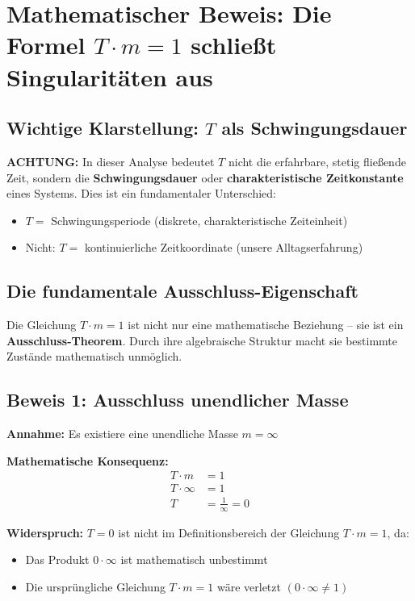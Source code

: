\section{Mathematischer Beweis: Die Formel $T \cdot m = 1$ schließt Singularitäten aus}

\subsection{Wichtige Klarstellung: $T$ als Schwingungsdauer}

\textbf{ACHTUNG:} In dieser Analyse bedeutet $T$ nicht die erfahrbare, stetig fließende Zeit, sondern die \textbf{Schwingungsdauer} oder \textbf{charakteristische Zeitkonstante} eines Systems. Dies ist ein fundamentaler Unterschied:

\begin{itemize}
	\item $T =$ Schwingungsperiode (diskrete, charakteristische Zeiteinheit)
	\item Nicht: $T =$ kontinuierliche Zeitkoordinate (unsere Alltagserfahrung)
\end{itemize}

\subsection{Die fundamentale Ausschluss-Eigenschaft}

Die Gleichung $T \cdot m = 1$ ist nicht nur eine mathematische Beziehung -- sie ist ein \textbf{Ausschluss-Theorem}. Durch ihre algebraische Struktur macht sie bestimmte Zustände mathematisch unmöglich.

\subsection{Beweis 1: Ausschluss unendlicher Masse}

\textbf{Annahme:} Es existiere eine unendliche Masse $m = \infty$

\textbf{Mathematische Konsequenz:}
\begin{align}
	T \cdot m &= 1\\
	T \cdot \infty &= 1\\
	T &= \frac{1}{\infty} = 0
\end{align}

\textbf{Widerspruch:} $T = 0$ ist nicht im Definitionsbereich der Gleichung $T \cdot m = 1$, da:
\begin{itemize}
	\item Das Produkt $0 \cdot \infty$ ist mathematisch unbestimmt
	\item Die ursprüngliche Gleichung $T \cdot m = 1$ wäre verletzt $(0 \cdot \infty \neq 1)$
\end{itemize}

